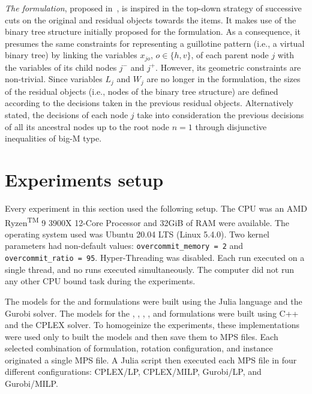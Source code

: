 \emph{The {\modelOrigami} formulation}, proposed in~\citet{martin:2020:top}, is inspired in the top-down strategy of successive cuts on the original and residual objects towards the items.
It makes use of the binary tree structure initially proposed for the {\modelHierarchical} formulation.
As a consequence, it presumes the same constraints for representing a guillotine pattern (i.e., a virtual binary tree) by linking the variables $x_{jo}$, $o \in \{h,v\}$, of each parent node $j$ with the variables of its child nodes $j^-$ and $j^+$.
However, its geometric constraints are non-trivial.
Since variables $L_j$ and $W_j$ are no longer in the formulation, the sizes of the residual objects (i.e., nodes of the binary tree structure) are defined according to the decisions taken in the previous residual objects.
Alternatively stated, the decisions of each node $j$ take into consideration the previous decisions of all its ancestral nodes up to the root node $n=1$ through disjunctive inequalities of big-M type.

\section{Experiments setup}
\label{sec:setup_other_formulations}

Every experiment in this section used the following setup.
The CPU was an AMD\textsuperscript{\textregistered} Ryzen\textsuperscript{TM} 9 3900X
 12-Core Processor %
and 32GiB of RAM were available. %
The operating system used was Ubuntu 20.04 LTS (Linux 5.4.0).
Two kernel parameters had non-default values: \texttt{overcommit_memory = 2} and \texttt{overcommit_ratio = 95}.
Hyper-Threading was disabled.
Each run executed on a single thread, and no runs executed simultaneously.
The computer did not run any other CPU bound task during the experiments.

The models for the {\modelBecker} and {\modelFMT} formulations were built using the Julia language and the Gurobi solver.
The models for the {\modelBCE}, {\modelGrid}, {\modelHierarchical}, {\modelImplicit}, and {\modelOrigami} formulations were built using C++ and the CPLEX solver.
To homogeinize the experiments, these implementations were used only to built the models and then save them to MPS files.
Each selected combination of formulation, rotation configuration, and instance originated a single MPS file.
A Julia script then executed each MPS file in four different configurations: CPLEX/LP, CPLEX/MILP, Gurobi/LP, and Gurobi/MILP.

